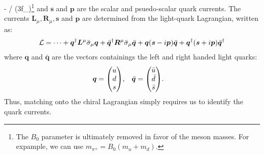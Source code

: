 \documentclass[a4paper,11pt]{article} \pdfoutput=1
\newcommand{\cL}{\mathcal{L}}
\newcommand{\fpi}{{f_{\pi}}}
\newcommand{\sibar}{{\bar{\sigma}}}
\begin{document}
- /
(3\fpi)\)\footnote{The \(B_{0}\) parameter is ultimately removed in favor of
the meson masses. For expample, we can use \(m_{\pi^{\pm}} =
B_{0}(m_{u}+m_{d})\).} and \(\bm{s}\) and \(\bm{p}\) are the scalar and
psuedo-scalar quark currents. The currents \(\bm{L}_{\mu}, \bm{R}_{\mu},
\bm{s}\) and \(\bm{p}\) are determined from the light-quark Lagrangian, written
as:
\begin{align}
	\cL =
	\cdots
	+ \bm{q}^{\dagger}\bm{L}^{\mu}\sibar_{\mu}\bm{q}
	+ \bar{\bm{q}}^{\dagger}\bm{R}^{\mu}\sibar_{\mu}\bar{\bm{q}}
	+ \bm{q}\qty(\bm{s}-i\bm{p})\bar{\bm{q}}
	+ \bm{q}^{\dagger}\qty(\bm{s}+i\bm{p})\bar{\bm{q}}^{\dagger}
\end{align}
where \(\bm{q}\) and \(\bar{\bm{q}}\) are the vectors containings the left and
right handed light quarks:
\begin{align}
	\bm{q}       & = \mqty(u       \\ d \\ s), &
	\bar{\bm{q}} & = \mqty(\bar{u} \\ \bar{d} \\ \bar{s}) .
\end{align}
Thus, matching onto the chiral Lagrangian simply requires us to identify the
quark currents.
\end{document}
